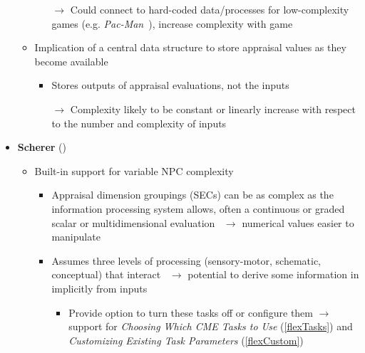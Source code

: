 \begin{itemize}
\begin{itemize}
\begin{itemize}
            \item [$\rightarrow$] Could connect to hard-coded data/processes
            for low-complexity games (e.g. \textit{Pac-Man}~\citep{pacman}),
            increase complexity with game
        \end{itemize}

        \item Implication of a central data structure to store appraisal values
        as they become available~\citep[p.~134, 151, 189,
        210--211]{lazarus1991emotion}
        \begin{itemize}
            \item Stores outputs of appraisal evaluations, not the inputs

            \item [$\rightarrow$] Complexity likely to be constant or linearly
            increase with respect to the number and complexity of inputs
        \end{itemize}
    \end{itemize}

    \item \textbf{Scherer} (\strong)
    \begin{itemize}
        \item Built-in support for variable NPC complexity
        \begin{itemize}
            \item Appraisal dimension groupings (SECs) can be as complex as the
            information processing system allows, often a continuous or graded
            scalar or multidimensional
            evaluation~\citep[p.~94]{scherer2001appraisalB} $\rightarrow$
            numerical values easier to manipulate

            \item Assumes three levels of processing (sensory-motor, schematic,
            conceptual) that
            interact~\citep[p.~102--103]{scherer2001appraisalB} $\rightarrow$
            potential to derive some information in \progname{} implicitly from
            inputs
            \begin{itemize}
                \item Provide option to turn these tasks off or configure them
                $\rightarrow$ support for \textit{Choosing Which CME Tasks to
                    Use} (\ref{flexTasks}) and \textit{Customizing Existing
                    Task
                    Parameters} (\ref{flexCustom})
            \end{itemize}
        \end{itemize}


\end{itemize}
\end{itemize}
